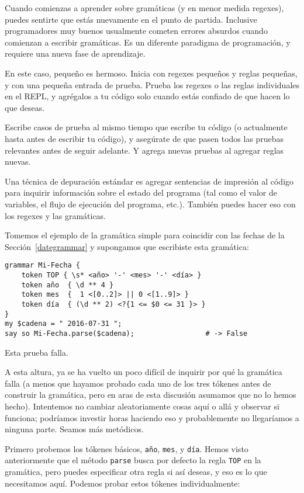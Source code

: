 Cuando comienzas a aprender sobre gramáticas (y en menor medida regexes),
puedes sentirte que estás nuevamente en el punto de partida. Inclusive
programadores muy buenos usualmente cometen errores absurdos cuando
comienzan a escribir gramáticas. Es un diferente paradigma de programación,
y requiere una nueva fase de aprendizaje.

En este caso, pequeño es hermoso. Inicia con regexes pequeños y reglas pequeñas,
y con una pequeña entrada de prueba. Prueba los regexes o las reglas individuales
en el REPL, y agrégalos a tu código solo cuando estás confiado
de que hacen lo que deseas.

Escribe casos de prueba al mismo tiempo que escribe tu código 
(o actualmente hasta antes de escribir tu código), y asegúrate de
que pasen todos las pruebas relevantes antes de seguir adelante.
Y agrega nuevas pruebas al agregar reglas nuevas.


Una técnica de depuración estándar es agregar sentencias de 
impresión al código para inquirir información sobre el estado
del programa (tal como el valor de variables, el flujo de
ejecución del programa, etc.). También puedes hacer eso con
los regexes y las gramáticas.

Tomemos el ejemplo de la gramática simple para coincidir
con las fechas de la Sección~\ref{dategrammar} y supongamos
que escribiste esta gramática:

\begin{lstlisting}
grammar Mi-Fecha {
    token TOP { \s* <año> '-' <mes> '-' <día> }
    token año  { \d ** 4 }                                        
    token mes  {  1 <[0..2]> || 0 <[1..9]> }                
    token día  { (\d ** 2) <?{1 <= $0 <= 31 }> }  
}                         
my $cadena = " 2016-07-31 ";
say so Mi-Fecha.parse($cadena);                 # -> False
\end{lstlisting}

Esta prueba falla.

A esta altura, ya se ha vuelto un poco difícil de inquirir
por qué la gramática falla (a menos que hayamos probado cada
uno de los tres tókenes antes de construir la gramática,
pero en aras de esta discusión asumamos que no lo hemos hecho).
Intentemos no cambiar aleatoriamente cosas aquí o allá y observar
si funciona; podríamos investir horas haciendo eso y probablemente
no llegaríamos a ninguna parte. Seamos más metódicos.

Primero probemos los tókenes básicos, {\tt año}, {\tt mes}, y {\tt día}.
Hemos visto anteriormente que el método {\tt parse} busca por defecto
la regla {\tt TOP} en la gramática, pero puedes especificar otra 
regla si así deseas, y eso es lo que necesitamos aquí. 
Podemos probar estos tókenes individualmente:

